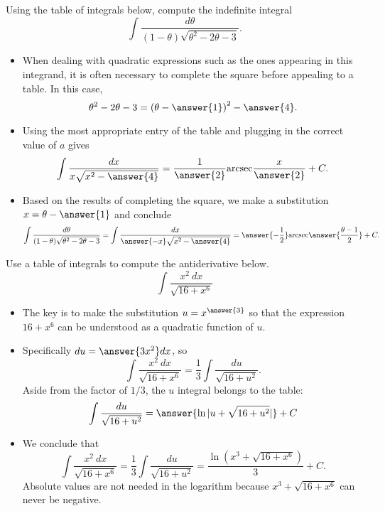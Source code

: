 \documentclass{ximera}
\begin{document}
\begin{example}%
Using the table of integrals below, compute the indefinite integral
\[ \int \frac{d \theta}{(1-\theta) \sqrt{\theta^2 - 2 \theta - 3}}.\]
\begin{itemize}
\item When dealing with quadratic expressions such as the ones appearing in this integrand, it is often necessary to complete the square before appealing to a table. In this case, 
\[ \theta^2 - 2 \theta - 3 = \left( \theta - \answer{1} \right)^2 - \answer{4}. \]
\item Using the most appropriate entry of the table and plugging in the correct value of $a$ gives
\[ \int \frac{dx}{x \sqrt{x^2 - \answer{4}}} = \frac{1}{\answer{2}} \mathrm{arcsec} \frac{x}{\answer{2}} + C. \]
\item Based on the results of completing the square, we make a substitution $x = \theta - \answer{1}$ and conclude
\[ \int \frac{d \theta}{(1-\theta) \sqrt{\theta^2 - 2 \theta - 3}} =  \int \frac{dx}{\answer{-x} \sqrt{x^2 - \answer{4}}} = \answer{- \frac{1}{2}} \mathrm{arcsec} \answer{\frac{\theta-1}{2}} + C. \]
\end{itemize}
\end{example}


\begin{example}%
Use a table of integrals to compute the antiderivative below.
\[ \int \frac{x^2 ~ dx}{\sqrt{16 + x^6}} \]
\begin{itemize}
\item The key is to make the substitution $u = x^{\answer{3}}$ so that the expression $16 + x^6$ can be understood as a quadratic function of $u$. 
\item Specifically $du = \answer{3x^2} dx$, so
\[ \int \frac{x^2 ~ dx}{\sqrt{16 + x^6}} = \frac{1}{3} \int \frac{du}{\sqrt{16+u^2}}. \] 
Aside from the factor of $1/3$, the $u$ integral belongs to the table:
\[ \int \frac{du}{\sqrt{16+u^2}} = \answer{\ln | u + \sqrt{16 + u^2}| } + C \]
\item We conclude that
\[  \int \frac{x^2 ~ dx}{\sqrt{16 + x^6}} = \frac{1}{3} \int \frac{du}{\sqrt{16+u^2}} = \frac{\ln ( x^3 + \sqrt{16 + x^6})}{3} + C. \]
Absolute values are not needed in the logarithm because $x^3 + \sqrt{16 + x^6}$ can never be negative. 
\end{itemize}
\end{example}
\end{document}
